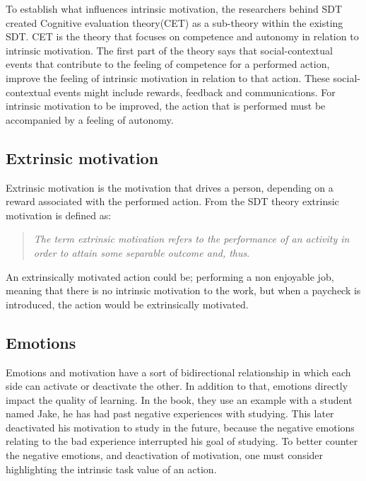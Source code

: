 To establish what influences intrinsic motivation, the researchers behind SDT\cite{SDT} created Cognitive evaluation theory(CET) as a sub-theory within the existing SDT. CET is the theory that focuses on competence and autonomy in relation to intrinsic motivation. The first part of the theory says that social-contextual events that contribute to the feeling of competence for a performed action, improve the feeling of intrinsic motivation in relation to that action\cite[p.~70]{SDT}. These social-contextual events might include rewards, feedback and communications\cite[p.~70]{SDT}. For intrinsic motivation to be improved, the action that is performed must be accompanied by a feeling of autonomy\cite[p.~70]{SDT}.

\subsection*{Extrinsic motivation}
Extrinsic motivation is the motivation that drives a person, depending on a reward associated with the performed action. From the SDT theory extrinsic motivation is defined as: 
\begin{quote}
	\textit{The term extrinsic motivation refers to the performance of an activity in order to attain some separable outcome and, thus}\cite[p.~71]{SDT}.\\
\end{quote}
An extrinsically motivated action could be; performing a non enjoyable job, meaning that there is no intrinsic motivation to the work, but when a paycheck is introduced, the action would be extrinsically motivated.

\subsection*{Emotions}
Emotions and motivation have a sort of bidirectional relationship in which each side can activate or deactivate the other\cite[pp.~66]{emotionsAndMotivation}. In addition to that, emotions directly impact the quality of learning\cite[pp.~66]{emotionsAndMotivation}. In the book\cite{emotionsAndMotivation}, they use an example with a student named Jake, he has had past negative experiences with studying. This later deactivated his motivation to study in the future, because the negative emotions relating to the bad experience interrupted his goal of studying\cite[pp.~67]{emotionsAndMotivation}. To better counter the negative emotions, and deactivation of motivation, one must consider highlighting the intrinsic task value of an action\cite[pp.68]{emotionsAndMotivation}.

